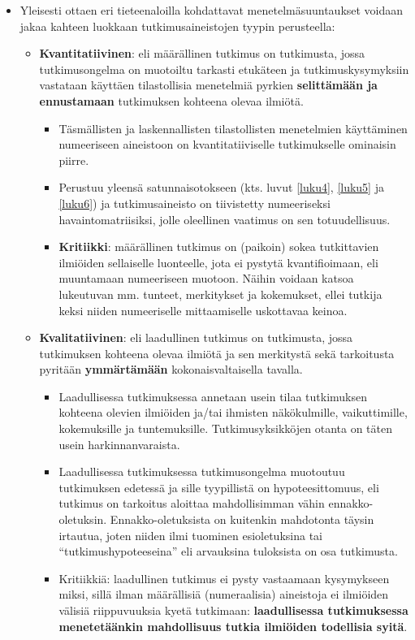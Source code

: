 \documentclass[
]{book}
\providecommand{\tightlist}{%
  \setlength{\itemsep}{0pt}\setlength{\parskip}{0pt}}
\begin{document}
\begin{itemize}
\tightlist
\item
  Yleisesti ottaen eri tieteenaloilla kohdattavat menetelmäsuuntaukset voidaan jakaa kahteen luokkaan tutkimusaineistojen tyypin perusteella:

  \begin{itemize}
  \tightlist
  \item
    \textbf{Kvantitatiivinen}: eli määrällinen tutkimus on tutkimusta, jossa tutkimusongelma on muotoiltu tarkasti etukäteen ja tutkimuskysymyksiin vastataan käyttäen tilastollisia menetelmiä pyrkien \textbf{selittämään ja ennustamaan} tutkimuksen kohteena olevaa ilmiötä.

    \begin{itemize}
    \tightlist
    \item
      Täsmällisten ja laskennallisten tilastollisten menetelmien käyttäminen numeeriseen aineistoon on kvantitatiiviselle tutkimukselle ominaisin piirre.
    \item
      Perustuu yleensä satunnaisotokseen (kts. luvut \ref{luku4}, \ref{luku5} ja \ref{luku6}) ja tutkimusaineisto on tiivistetty numeeriseksi havaintomatriisiksi, jolle oleellinen vaatimus on sen totuudellisuus.
    \item
      \textbf{Kritiikki}: määrällinen tutkimus on (paikoin) sokea tutkittavien ilmiöiden sellaiselle luonteelle, jota ei pystytä kvantifioimaan, eli muuntamaan numeeriseen muotoon. Näihin voidaan katsoa lukeutuvan mm. tunteet, merkitykset ja kokemukset, ellei tutkija keksi niiden numeeriselle mittaamiselle uskottavaa keinoa.\\
    \end{itemize}
  \item
    \textbf{Kvalitatiivinen}: eli laadullinen tutkimus on tutkimusta, jossa tutkimuksen kohteena olevaa ilmiötä ja sen merkitystä sekä tarkoitusta pyritään \textbf{ymmärtämään} kokonaisvaltaisella tavalla.

    \begin{itemize}
    \tightlist
    \item
      Laadullisessa tutkimuksessa annetaan usein tilaa tutkimuksen kohteena olevien ilmiöiden ja/tai ihmisten näkökulmille, vaikuttimille, kokemuksille ja tuntemuksille. Tutkimusyksikköjen otanta on täten usein harkinnanvaraista.
    \item
      Laadullisessa tutkimuksessa tutkimusongelma muotoutuu tutkimuksen edetessä ja sille tyypillistä on hypoteesittomuus, eli tutkimus on tarkoitus aloittaa mahdollisimman vähin ennakko-oletuksin. Ennakko-oletuksista on kuitenkin mahdotonta täysin irtautua, joten niiden ilmi tuominen esioletuksina tai ``tutkimushypoteeseina'' eli arvauksina tuloksista on osa tutkimusta.
    \item
      Kritiikkiä: laadullinen tutkimus ei pysty vastaamaan kysymykseen miksi, sillä ilman määrällisiä (numeraalisia) aineistoja ei ilmiöiden välisiä riippuvuuksia kyetä tutkimaan: \textbf{laadullisessa tutkimuksessa menetetäänkin mahdollisuus tutkia ilmiöiden todellisia syitä}.


\end{itemize}
\end{itemize}
\end{itemize}
\end{document}
